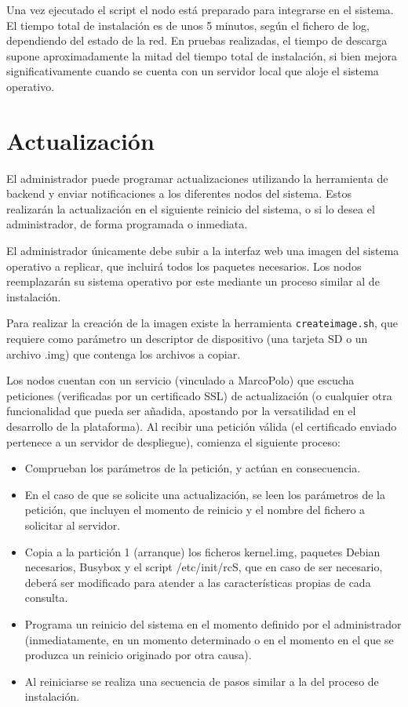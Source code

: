 \documentclass{article}
\begin{document}
Una vez ejecutado el script el nodo está preparado para integrarse en el sistema. El tiempo total de instalación es de unos 5 minutos, según el fichero de log, dependiendo del estado de la red. En pruebas realizadas, el tiempo de descarga supone aproximadamente la mitad del tiempo total de instalación, si bien mejora significativamente cuando se cuenta con un servidor local que aloje el sistema operativo.

\section{Actualización}

El administrador puede programar actualizaciones utilizando la herramienta de backend y enviar notificaciones a los diferentes nodos del sistema. Estos realizarán la actualización en el siguiente reinicio del sistema, o si lo desea el administrador, de forma programada o inmediata.

El administrador únicamente debe subir a la interfaz web una imagen del sistema operativo a replicar, que incluirá todos los paquetes necesarios. Los nodos reemplazarán su sistema operativo por este mediante un proceso similar al de instalación.

Para realizar la creación de la imagen existe la herramienta \texttt{createimage.sh}, que requiere como parámetro un descriptor de dispositivo (una tarjeta SD o un archivo .img) que contenga los archivos a copiar.

Los nodos cuentan con un servicio (vinculado a MarcoPolo) que escucha peticiones (verificadas por un certificado SSL) de actualización (o cualquier otra funcionalidad que pueda ser añadida, apostando por la versatilidad en el desarrollo de la plataforma). Al recibir una petición válida (el certificado enviado pertenece a un servidor de despliegue), comienza el siguiente proceso:

\begin{itemize}
	\item Comprueban los parámetros de la petición, y actúan en consecuencia.
	\item En el caso de que se solicite una actualización, se leen los parámetros de la petición, que incluyen el momento de reinicio y el nombre del fichero a solicitar al servidor.
	\item Copia a la partición 1 (arranque) los ficheros kernel.img, paquetes Debian necesarios, Busybox y el script /etc/init/rcS, que en caso de ser necesario, deberá ser modificado para atender a las características propias de cada consulta.
	\item Programa un reinicio del sistema en el momento definido por el administrador (inmediatamente, en un momento determinado o en el momento en el que se produzca un reinicio originado por otra causa).
	\item Al reiniciarse se realiza una secuencia de pasos similar a la del proceso de instalación.

\end{itemize}
\end{document}
